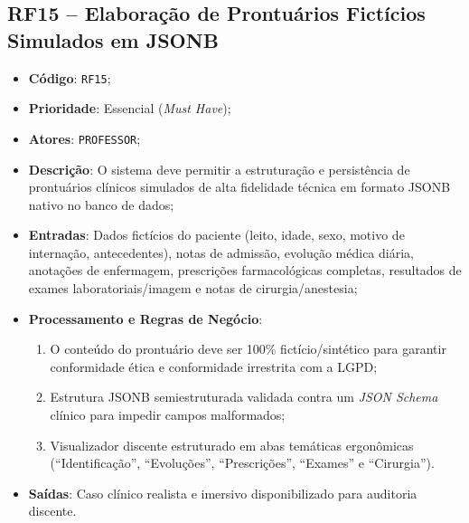 \subsection{RF15 -- Elaboração de Prontuários Fictícios Simulados em JSONB}
\begin{itemize}
    \item \textbf{Código}: \texttt{RF15};
    \item \textbf{Prioridade}: Essencial (\textit{Must Have});
    \item \textbf{Atores}: \texttt{PROFESSOR};
    \item \textbf{Descrição}: O sistema deve permitir a estruturação e persistência de prontuários clínicos simulados de alta fidelidade técnica em formato JSONB nativo no banco de dados;
    \item \textbf{Entradas}: Dados fictícios do paciente (leito, idade, sexo, motivo de internação, antecedentes), notas de admissão, evolução médica diária, anotações de enfermagem, prescrições farmacológicas completas, resultados de exames laboratoriais/imagem e notas de cirurgia/anestesia;
    \item \textbf{Processamento e Regras de Negócio}:
    \begin{enumerate}
        \item O conteúdo do prontuário deve ser 100\% fictício/sintético para garantir conformidade ética e conformidade irrestrita com a LGPD;
        \item Estrutura JSONB semiestruturada validada contra um \textit{JSON Schema} clínico para impedir campos malformados;
        \item Visualizador discente estruturado em abas temáticas ergonômicas (``Identificação'', ``Evoluções'', ``Prescrições'', ``Exames'' e ``Cirurgia'').
    \end{enumerate}
    \item \textbf{Saídas}: Caso clínico realista e imersivo disponibilizado para auditoria discente.
\end{itemize}

